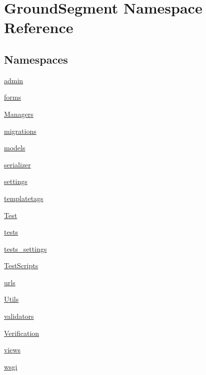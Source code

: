 \hypertarget{namespace_ground_segment}{}\section{Ground\+Segment Namespace Reference}
\label{namespace_ground_segment}
\subsection*{Namespaces}
\begin{DoxyCompactItemize}
\item 
 \hyperlink{namespace_ground_segment_1_1admin}{admin}
\item 
 \hyperlink{namespace_ground_segment_1_1forms}{forms}
\item 
 \hyperlink{namespace_ground_segment_1_1_managers}{Managers}
\item 
 \hyperlink{namespace_ground_segment_1_1migrations}{migrations}
\item 
 \hyperlink{namespace_ground_segment_1_1models}{models}
\item 
 \hyperlink{namespace_ground_segment_1_1serializer}{serializer}
\item 
 \hyperlink{namespace_ground_segment_1_1settings}{settings}
\item 
 \hyperlink{namespace_ground_segment_1_1templatetags}{templatetags}
\item 
 \hyperlink{namespace_ground_segment_1_1_test}{Test}
\item 
 \hyperlink{namespace_ground_segment_1_1tests}{tests}
\item 
 \hyperlink{namespace_ground_segment_1_1tests__settings}{tests\+\_\+settings}
\item 
 \hyperlink{namespace_ground_segment_1_1_test_scripts}{Test\+Scripts}
\item 
 \hyperlink{namespace_ground_segment_1_1urls}{urls}
\item 
 \hyperlink{namespace_ground_segment_1_1_utils}{Utils}
\item 
 \hyperlink{namespace_ground_segment_1_1validators}{validators}
\item 
 \hyperlink{namespace_ground_segment_1_1_verification}{Verification}
\item 
 \hyperlink{namespace_ground_segment_1_1views}{views}
\item 
 \hyperlink{namespace_ground_segment_1_1wsgi}{wsgi}
\end{DoxyCompactItemize}
